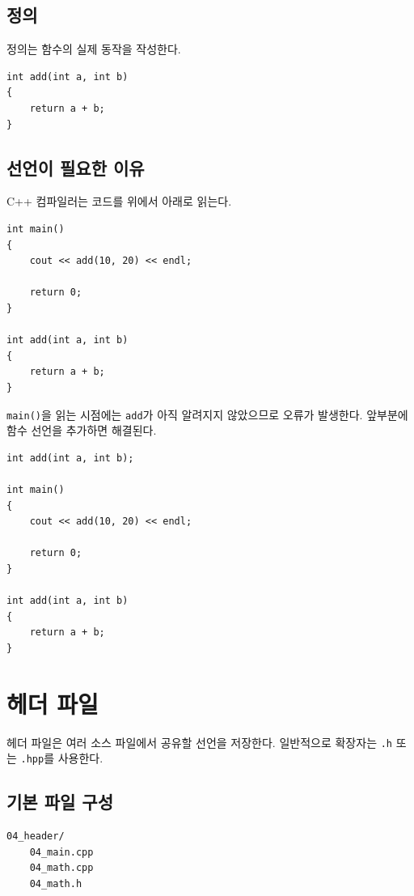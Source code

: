 \documentclass[11pt,a4paper]{article}
\begin{document}
\subsection{정의}

정의는 함수의 실제 동작을 작성한다.

\begin{lstlisting}
int add(int a, int b)
{
    return a + b;
}
\end{lstlisting}

\subsection{선언이 필요한 이유}

C++ 컴파일러는 코드를 위에서 아래로 읽는다.

\begin{lstlisting}
int main()
{
    cout << add(10, 20) << endl;

    return 0;
}

int add(int a, int b)
{
    return a + b;
}
\end{lstlisting}

\texttt{main()}을 읽는 시점에는 \texttt{add}가 아직 알려지지 않았으므로 오류가 발생한다.
앞부분에 함수 선언을 추가하면 해결된다.

\begin{lstlisting}
int add(int a, int b);

int main()
{
    cout << add(10, 20) << endl;

    return 0;
}

int add(int a, int b)
{
    return a + b;
}
\end{lstlisting}

\section{헤더 파일}

헤더 파일은 여러 소스 파일에서 공유할 선언을 저장한다.
일반적으로 확장자는 \texttt{.h} 또는 \texttt{.hpp}를 사용한다.

\subsection{기본 파일 구성}

\begin{verbatim}
04_header/
    04_main.cpp
    04_math.cpp
    04_math.h
\end{verbatim}
\end{document}
